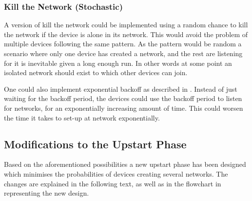 \subsubsection{Kill the Network (Stochastic)}\label{KtNR}
A version of kill the network could be implemented using a random chance to kill the network if the device is alone in its network.
This would avoid the problem of multiple devices following the same pattern.
As the pattern would be random a scenario where only one device has created a network, and the rest are listening for it is inevitable given a long enough run.
In other words at some point an isolated network should exist to which other devices can join.

One could also implement exponential backoff as described in .
Instead of just waiting for the backoff period, the devices could use the backoff period to listen for networks, for an exponentially increasing amount of time. 
This could worsen the time it takes to set-up at network exponentially.

\subsection{Modifications to the Upstart Phase}                 
Based on the aforementioned possibilities a new upstart phase has been designed which minimises the probabilities of devices creating several networks.
The changes are explained in the following text, as well as in the flowchart in  representing the new design.

